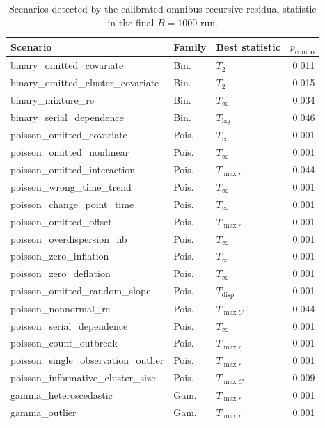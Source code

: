 \begin{table}[H]
\centering
\scriptsize
\caption{Scenarios detected by the calibrated omnibus recursive-residual statistic in the final $B=1000$ run.}
\label{tab:detected-scenarios}
\begin{tabular}{lllr}
\toprule
Scenario & Family & Best statistic & $p_{\mathrm{combo}}$ \\
\midrule
binary\_omitted\_covariate & Bin. & $T_2$ & 0.011 \\
binary\_omitted\_cluster\_covariate & Bin. & $T_2$ & 0.015 \\
binary\_mixture\_re & Bin. & $T_\infty$ & 0.034 \\
binary\_serial\_dependence & Bin. & $T_{\mathrm{lag}}$ & 0.046 \\
poisson\_omitted\_covariate & Pois. & $T_\infty$ & 0.001 \\
poisson\_omitted\_nonlinear & Pois. & $T_\infty$ & 0.001 \\
poisson\_omitted\_interaction & Pois. & $T_{\max r}$ & 0.044 \\
poisson\_wrong\_time\_trend & Pois. & $T_\infty$ & 0.001 \\
poisson\_change\_point\_time & Pois. & $T_\infty$ & 0.001 \\
poisson\_omitted\_offset & Pois. & $T_{\max r}$ & 0.001 \\
poisson\_overdispersion\_nb & Pois. & $T_\infty$ & 0.001 \\
poisson\_zero\_inflation & Pois. & $T_\infty$ & 0.001 \\
poisson\_zero\_deflation & Pois. & $T_\infty$ & 0.001 \\
poisson\_omitted\_random\_slope & Pois. & $T_{\mathrm{disp}}$ & 0.001 \\
poisson\_nonnormal\_re & Pois. & $T_{\max C}$ & 0.044 \\
poisson\_serial\_dependence & Pois. & $T_\infty$ & 0.001 \\
poisson\_count\_outbreak & Pois. & $T_{\max r}$ & 0.001 \\
poisson\_single\_observation\_outlier & Pois. & $T_{\max r}$ & 0.001 \\
poisson\_informative\_cluster\_size & Pois. & $T_{\max C}$ & 0.009 \\
gamma\_heteroscedastic & Gam. & $T_{\max r}$ & 0.001 \\
gamma\_outlier & Gam. & $T_{\max r}$ & 0.001 \\
\bottomrule
\end{tabular}
\end{table}
